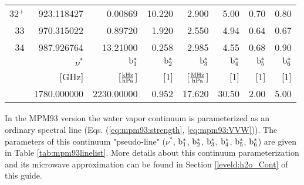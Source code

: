 \begin{longtable}{rrrrrrrr}
32$^+$ & 923.118427 & 0.00869 & 10.220& 2.900 & 5.00 & 0.70 & 0.80 \\
33     & 970.315022 & 0.89720 & 1.920 & 2.550 & 4.94 & 0.64 & 0.67 \\
34     & 987.926764 & 13.21000& 0.258 & 2.985 & 4.55 & 0.68 & 0.90 \\
\hline
 & $\nu^*$ & $\rm b^*_{\rm 1}$ & $\rm b^*_{\rm 2}$ & $\rm b^*_{\rm 3}$ & $\rm b^*_{\rm 4}$ & $\rm b^*_{\rm 5}$ & $\rm b^*_{\rm 6}$\\
 & {\rm [GHz]}  & {[$\frac{\rm kHz}{\rm hPa}$]} & {\rm [1]} & 
 {[$\frac{\rm MHz}{\rm hPa}$]} & {\rm [1]} & {\rm [1]} & {\rm [1]} \\
\hline
 & 1780.000000 & 2230.00000 & 0.952 & 17.620 & 30.50 & 2.00 & 5.00 \\
\end{longtable}



\label{levele:mpm93:h2ocont}
In the MPM93 version the water vapor continuum is parameterized as an
ordinary spectral line (Eqs. (\ref{eq:mpm93:strength}, 
\ref{eq:mpm93:VVW})). The parameters of this continuum "pseudo-line" 
($\nu^*$, $\rm b^*_{\rm 1}$, $\rm b^*_{\rm 2}$, $\rm b^*_{\rm 3}$, $\rm b^*_{\rm 4}$, $\rm b^*_{\rm 5}$, $\rm b^*_{\rm 6}$) 
are given in Table \ref{tab:mpm93linelist}. More details about 
this continuum parameterization and its microwave approximation can be 
found in Section \ref{leveld:h2o_Cont} of this guide.




\label{leveld:cp98}

